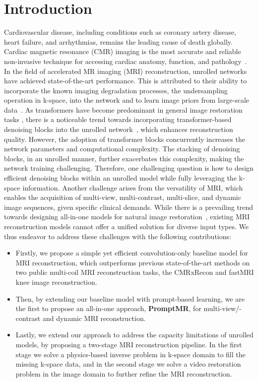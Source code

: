 \documentclass[runningheads]{llncs}
\begin{document}
 




\section{Introduction}
Cardiovascular disease, including conditions such as coronary artery disease, heart failure, and arrhythmias, remains the leading cause of death globally. Cardiac magnetic resonance (CMR) imaging is the most accurate and reliable non-invasive technique for accessing cardiac anatomy, function, and pathology~\cite{rajiah2023cardiac}. 
In the field of accelerated MR imaging (MRI) reconstruction, unrolled networks have achieved state-of-the-art performance.
This is attributed to their ability to incorporate the known imaging degradation processes, the undersampling operation in k-space, 
into the network and to learn image priors from large-scale data~\cite{sriram2020end,fabian2022humus}. As transformers have become predominant in general image restoration tasks \cite{zamir2022restormer,liang2021swinir}, there is a noticeable trend towards incorporating transformer-based denoising blocks into the unrolled network~\cite{fabian2022humus}, which enhances reconstruction quality. However, the adoption of transformer blocks concurrently increases the network parameters and computational complexity. The stacking of denoising blocks, in an unrolled manner, further exacerbates this complexity, making the network training challenging.
Therefore, one challenging question is how to design efficient denoising blocks within an unrolled model while fully leveraging the k-space information. Another challenge arises from the versatility of MRI, which enables the acquisition of multi-view, multi-contrast, multi-slice, and dynamic image sequences, given specific clinical demands. 
While there is a prevailing trend towards designing all-in-one models for natural image restoration~\cite{li2022all,potlapalli2023promptir}, existing MRI reconstruction models cannot offer a unified solution for diverse input types. We thus endeavor to address these challenges with the following contributions:
\begin{itemize}[label=$\bullet$]
    \item Firstly, we propose a simple yet efficient convolution-only baseline model for MRI reconstruction, which outperforms previous state-of-the-art methods on two public multi-coil MRI reconstruction tasks, the CMRxRecon and fastMRI knee image reconstruction.
    \item Then, by extending our baseline model with prompt-based learning, we are the first to propose an all-in-one approach, \textbf{PromptMR}, for multi-view/-contrast and dynamic MRI reconstruction.
    \item Lastly, we extend our approach to address the capacity limitations of unrolled models, by proposing a two-stage MRI reconstruction pipeline. In the  first stage we solve a physics-based inverse problem in k-space domain to fill the missing k-space data, and in the second stage we solve a video restoration problem in the image domain to further refine the MRI reconstruction.
\end{itemize}
\end{document}
